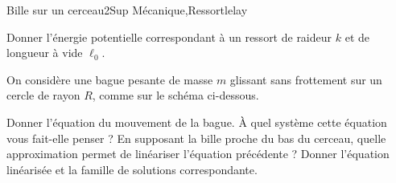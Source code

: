 
\begin{exercise}{Bille sur un cerceau}{2}{Sup}
{Mécanique,Ressort}{lelay}


\begin{questions}
    \questioncours Donner l'énergie potentielle correspondant à un ressort de raideur $k$ et de longueur à vide $\ell_0$.

\begin{EnvUplevel}
On considère une bague pesante de masse $m$ glissant sans frottement sur un cercle de rayon $R$, comme sur le schéma ci-dessous.

\begin{center}
\end{center}

\end{EnvUplevel}
    
    \question Donner l'équation du mouvement de la bague. À quel système cette équation vous fait-elle penser ?
    \question En supposant la bille proche du bas du cerceau, quelle approximation permet de linéariser l'équation précédente ? Donner l'équation linéarisée et la famille de solutions correspondante.

\begin{center}
\end{center}
\end{questions}
\end{exercise}
